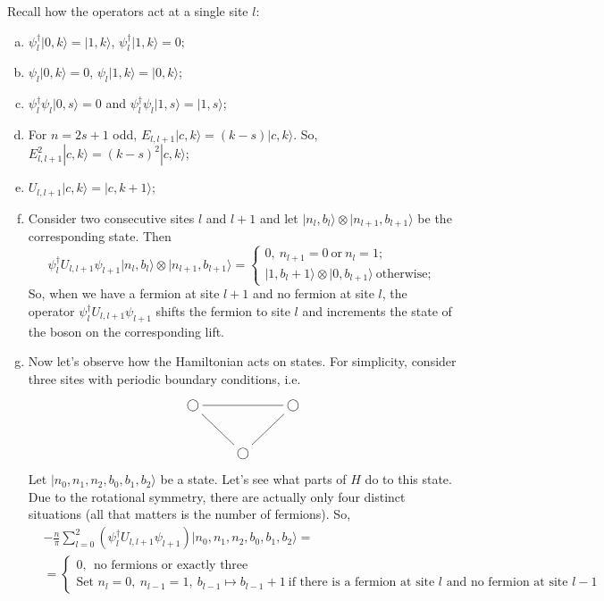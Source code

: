 	Recall how the operators act at a single site $l$:
	\begin{enumerate}[(a)]
	\item $\psi^\dagger_l |0,k\rangle = |1,k\rangle$, $\psi^\dagger_l |1,k\rangle = 0$;
	\item $\psi_l|0,k\rangle = 0$, $\psi_l|1,k\rangle = |0,k\rangle$;
	\item $\psi^\dagger_l \psi_l |0, s\rangle = 0$ and $\psi^\dagger_l \psi_l |1,s\rangle = |1,s\rangle$;
	\item For $n = 2s+1$ odd, $E_{l,l+1}|c,k\rangle = (k-s)|c,k\rangle$. So, $E_{l,l+1}^2|c,k\rangle = (k-s)^2 |c,k\rangle$;
	\item $U_{l,l+1} |c,k\rangle = |c,k+1\rangle$;
	\item Consider two consecutive sites $l$ and $l+1$ and let $|n_l,b_l\rangle \otimes |n_{l+1},b_{l+1}\rangle$ be the corresponding state. Then 
	\[
	\psi_l^\dagger U_{l,l+1} \psi_{l+1} |n_l,b_l\rangle \otimes |n_{l+1},b_{l+1}\rangle = \begin{cases}
	0, \ n_{l+1} = 0 \ \text{or} \ n_{l} = 1;\\
	|1,b_l+1\rangle \otimes |0,b_{l+1}\rangle \ \text{otherwise};
	\end{cases}
	\]
	So, when we have a fermion at site $l+1$ and no fermion at site $l$, the operator $\psi_l^\dagger U_{l,l+1} \psi_{l+1}$ shifts the fermion to site $l$ and increments the state of the boson on the corresponding lift.
	\item Now let's observe how the Hamiltonian acts on states. For simplicity, consider three sites with periodic boundary conditions, i.e.
	\[
	\xymatrix{
	\bigcirc \ar@{-}[rr]& & \bigcirc \\
	& \bigcirc\ar@{-}[ru] \ar@{-}[lu] &
	}
	\]
	Let $|n_0,n_1,n_2,b_0,b_1,b_2\rangle$ be a state. Let's see what parts of $H$ do to this state. Due to the rotational symmetry, there are actually only four distinct situations (all that matters is the number of fermions). So, 
	\[\begin{split}
&-\frac{n}{\pi}\sum_{l=0}^2 (\psi^\dagger_l U_{l,l+1} \psi_{l+1}) |n_0,n_1,n_2,b_0,b_1,b_2\rangle =\\ &= \begin{cases}
0, \ \ \text{no fermions or exactly three}\\
\text{Set } n_{l} = 0, \ n_{l-1} = 1, \ b_{l-1} \mapsto b_{l-1} + 1 \ \text{if there is a fermion at site }l \text{ and no fermion at site }l-1
\end{cases}
\end{split}
	\]
	\end{enumerate}
